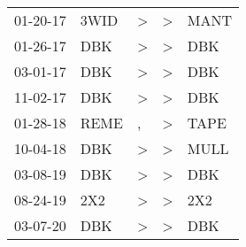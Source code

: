 \begin{supertabular}{lllll}
 01-20-17 &  3WID &     \textgreater &     \textgreater &  MANT \\
 01-26-17 &   DBK &     \textgreater &     \textgreater &   DBK \\
 03-01-17 &   DBK &     \textgreater &     \textgreater &   DBK \\
 11-02-17 &   DBK &     \textgreater &     \textgreater &   DBK \\
 01-28-18 &  REME &                , &     \textgreater &  TAPE \\
 10-04-18 &   DBK &     \textgreater &     \textgreater &  MULL \\
 03-08-19 &   DBK &     \textgreater &     \textgreater &   DBK \\
 08-24-19 &   2X2 &     \textgreater &     \textgreater &   2X2 \\
 03-07-20 &   DBK &     \textgreater &     \textgreater &   DBK \\
\end{supertabular}
